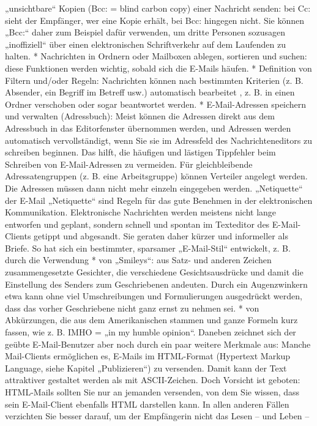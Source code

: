 \documentclass[]{book}
\theoremstyle{definition}
\theoremstyle{definition}
\theoremstyle{definition}
\theoremstyle{remark}
\begin{document}
„unsichtbare`` Kopien (Bcc: = blind carbon copy) einer Nachricht senden:
bei Cc: sieht der Empfänger, wer eine Kopie erhält, bei Bcc: hingegen
nicht. Sie können „Bcc:`` daher zum Beispiel dafür verwenden, um dritte
Personen sozusagen „inoffiziell`` über einen elektronischen
Schriftverkehr auf dem Laufenden zu halten. * Nachrichten in Ordnern
oder Mailboxen ablegen, sortieren und suchen: diese Funktionen werden
wichtig, sobald sich die E-Mails häufen. * Definition von Filtern
und/oder Regeln: Nachrichten können nach bestimmten Kriterien (z. B.
Absender, ein Begriff im Betreff usw.) automatisch bearbeitet , z. B. in
einen Ordner verschoben oder sogar beantwortet werden. * E-Mail-Adressen
speichern und verwalten (Adressbuch): Meist können die Adressen direkt
aus dem Adressbuch in das Editorfenster übernommen werden, und Adressen
werden automatisch vervollständigt, wenn Sie sie im Adressfeld des
Nachrichteneditors zu schreiben beginnen. Das hilft, die häufigen und
lästigen Tippfehler beim Schreiben von E-Mail-Adressen zu vermeiden. Für
gleichbleibende Adressatengruppen (z. B. eine Arbeitsgruppe) können
Verteiler angelegt werden. Die Adressen müssen dann nicht mehr einzeln
eingegeben werden. „Netiquette`` der E-Mail „Netiquette`` sind Regeln
für das gute Benehmen in der elektronischen Kommunikation. Elektronische
Nachrichten werden meistens nicht lange entworfen und geplant, sondern
schnell und spontan im Texteditor des E-Mail-Clients getippt und
abgesandt. Sie geraten daher kürzer und informeller als Briefe. So hat
sich ein bestimmter, sparsamer „E-Mail-Stil`` entwickelt, z. B. durch
die Verwendung * von „Smileys``: aus Satz- und anderen Zeichen
zusammengesetzte Gesichter, die verschiedene Gesichtsausdrücke und damit
die Einstellung des Senders zum Geschriebenen andeuten. Durch ein
Augenzwinkern etwa kann ohne viel Umschreibungen und Formulierungen
ausgedrückt werden, dass das vorher Geschriebene nicht ganz ernst zu
nehmen sei. * von Abkürzungen, die aus dem Amerikanischen stammen und
ganze Formeln kurz fassen, wie z. B. IMHO = „in my humble opinion``.
Daneben zeichnet sich der geübte E-Mail-Benutzer aber noch durch ein
paar weitere Merkmale aus: Manche Mail-Clients ermöglichen es, E-Mails
im HTML-Format (Hypertext Markup Language, siehe Kapitel „Publizieren``)
zu versenden. Damit kann der Text attraktiver gestaltet werden als mit
ASCII-Zeichen. Doch Vorsicht ist geboten: HTML-Mails sollten Sie nur an
jemanden versenden, von dem Sie wissen, dass sein E-Mail-Client
ebenfalls HTML darstellen kann. In allen anderen Fällen verzichten Sie
besser darauf, um der Empfängerin nicht das Lesen -- und Leben --
\end{document}
